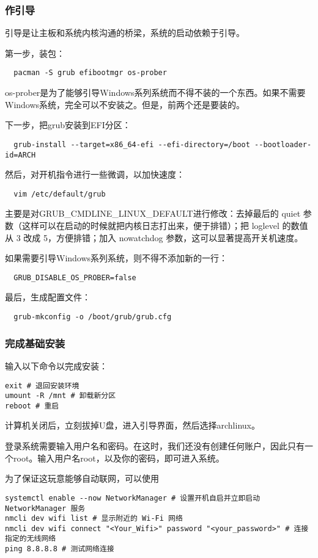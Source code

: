 \documentclass[../main.tex]{subfiles}
\begin{document}
\subsubsection{作引导}

引导是让主板和系统内核沟通的桥梁，系统的启动依赖于引导。

第一步，装包：
\begin{lstlisting}
  pacman -S grub efibootmgr os-prober
\end{lstlisting}
os-prober是为了能够引导Windows系列系统而不得不装的一个东西。如果不需要Windows系统，完全可以不安装之。但是，前两个还是要装的。

下一步，把grub安装到EFI分区：
\begin{lstlisting}
  grub-install --target=x86_64-efi --efi-directory=/boot --bootloader-id=ARCH
\end{lstlisting}

然后，对开机指令进行一些微调，以加快速度：
\begin{lstlisting}
  vim /etc/default/grub
\end{lstlisting}
主要是对GRUB\_CMDLINE\_LINUX\_DEFAULT进行修改：去掉最后的 quiet 参数（这样可以在启动的时候就把内核日志打出来，便于排错）；把 loglevel 的数值从 3 改成 5，方便排错；加入 nowatchdog 参数，这可以显著提高开关机速度。

如果需要引导Windows系列系统，则不得不添加新的一行：
\begin{lstlisting}
  GRUB_DISABLE_OS_PROBER=false
\end{lstlisting}

最后，生成配置文件：
\begin{lstlisting}
  grub-mkconfig -o /boot/grub/grub.cfg
\end{lstlisting}

\subsubsection{完成基础安装}

输入以下命令以完成安装：
\begin{lstlisting}
exit # 退回安装环境
umount -R /mnt # 卸载新分区
reboot # 重启
\end{lstlisting}
计算机关闭后，立刻拔掉U盘，进入引导界面，然后选择archlinux。

登录系统需要输入用户名和密码。在这时，我们还没有创建任何账户，因此只有一个root。输入用户名root，以及你的密码，即可进入系统。

为了保证这玩意能够自动联网，可以使用
\begin{lstlisting}
systemctl enable --now NetworkManager # 设置开机自启并立即启动 NetworkManager 服务
nmcli dev wifi list # 显示附近的 Wi-Fi 网络
nmcli dev wifi connect "<Your_Wifi>" password "<your_password>" # 连接指定的无线网络
ping 8.8.8.8 # 测试网络连接
\end{lstlisting}
\end{document}

